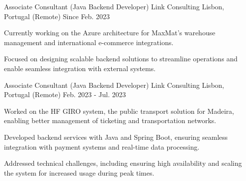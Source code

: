 


\begin{cventries}


  \cventry
  {Associate Consultant (Java Backend Developer)} %
  {Link Consulting} %
  {Lisbon, Portugal (Remote)} %
  {Since Feb. 2023} %
  { %
    \begin{cvitems}
      \item {Currently working on the Azure architecture for MaxMat's warehouse management and international e-commerce integrations.}
      \item {Focused on designing scalable backend solutions to streamline operations and enable seamless integration with external systems.}
    \end{cvitems}
  }

  \vspace{0.4cm}


  \cventry
  {Associate Consultant (Java Backend Developer)} %
  {Link Consulting} %
  {Lisbon, Portugal (Remote)} %
  {Feb. 2023 - Jul. 2023} %
  { %
    \begin{cvitems}
      \item {Worked on the HF GIRO system, the public transport solution for Madeira, enabling better management of ticketing and transportation networks.}
      \item {Developed backend services with Java and Spring Boot, ensuring seamless integration with payment systems and real-time data processing.}
      \item {Addressed technical challenges, including ensuring high availability and scaling the system for increased usage during peak times.}
    \end{cvitems}
  }


\end{cventries}
